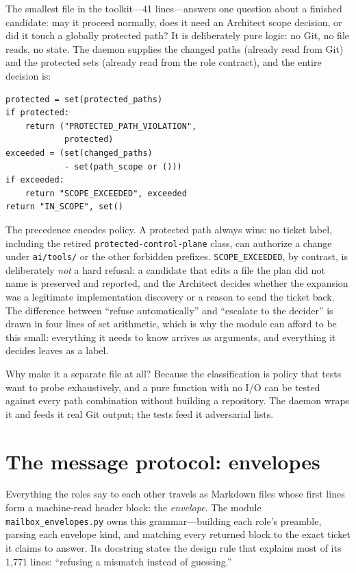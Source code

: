 \documentclass[10pt,aps,prd,twocolumn,nofootinbib]{revtex4-2}
\newcommand{\code}[1]{\texttt{#1}}
\newcommand{\file}[1]{\texttt{#1}}
\begin{document}
The smallest file in the toolkit---41 lines---answers one question
about a finished candidate: may it proceed normally, does it need an
Architect scope decision, or did it touch a globally protected path?
It is deliberately pure logic: no Git, no file reads, no state.  The
daemon supplies the changed paths (already read from Git) and the
protected sets (already read from the role contract), and the entire
decision is:

\begin{verbatim}
protected = set(protected_paths)
if protected:
    return ("PROTECTED_PATH_VIOLATION",
            protected)
exceeded = (set(changed_paths)
            - set(path_scope or ()))
if exceeded:
    return "SCOPE_EXCEEDED", exceeded
return "IN_SCOPE", set()
\end{verbatim}

The precedence encodes policy.  A protected path always wins: no
ticket label, including the retired \code{protected-control-plane}
class, can authorize a change under \file{ai/tools/} or the other
forbidden prefixes.  \code{SCOPE\_EXCEEDED}, by contrast, is
deliberately \emph{not} a hard refusal: a candidate that edits a file
the plan did not name is preserved and reported, and the Architect
decides whether the expansion was a legitimate implementation
discovery or a reason to send the ticket back.  The difference between
``refuse automatically'' and ``escalate to the decider'' is drawn in
four lines of set arithmetic, which is why the module can afford to be
this small: everything it needs to know arrives as arguments, and
everything it decides leaves as a label.

Why make it a separate file at all?  Because the classification is
policy that tests want to probe exhaustively, and a pure function with
no I/O can be tested against every path combination without building a
repository.  The daemon wraps it and feeds it real Git output; the
tests feed it adversarial lists.

\section{The message protocol: envelopes}
\label{sec:envelopes}

Everything the roles say to each other travels as Markdown files whose
first lines form a machine-read header block: the \emph{envelope}.
The module \file{mailbox\_envelopes.py} owns this grammar---building
each role's preamble, parsing each envelope kind, and matching every
returned block to the exact ticket it claims to answer.  Its docstring
states the design rule that explains most of its 1{,}771 lines:
``refusing a mismatch instead of guessing.''
\end{document}
